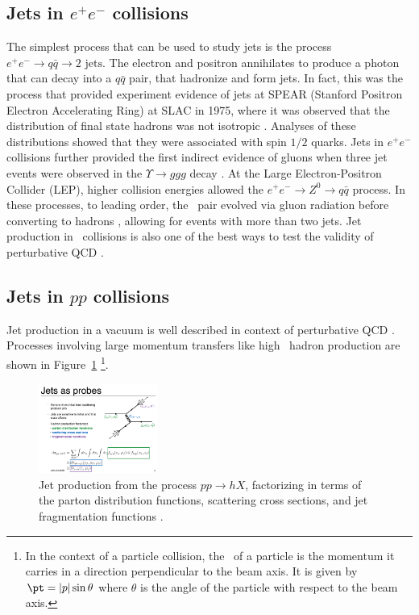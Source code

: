 \subsection{Jets in $e^+ e^-$ collisions}
The simplest process that can be used to study jets is the process $e^+ e^- \rightarrow q \bar{q} \rightarrow 2 \text{ jets}$.
The electron and positron annihilates to produce a photon that can decay into a $q \bar{q}$ pair, that hadronize and form jets.
In fact, this was the process that provided experiment evidence of jets at SPEAR (Stanford Positron Electron Accelerating Ring) at SLAC in 1975, where it was observed that the distribution of final state hadrons was not isotropic \cite{PhysRevLett.35.1609, PhysRevD.26.991}.
Analyses of these distributions showed that they were associated with spin $1/2$ quarks.
Jets in $e^+ e^-$ collisions further provided the first indirect evidence of gluons when three jet events were observed in the $\Upsilon \rightarrow ggg$ decay \cite{Berger:1978rr, Berger:1979cj}. 
At the Large Electron-Positron Collider (LEP), higher collision energies allowed the $e^+ e^- \rightarrow Z^0 \rightarrow q \bar{q}$ process.
In these processes, to leading order, the \qqbar\ pair evolved via gluon radiation before converting to hadrons \cite{Mueller_1991}, allowing for events with more than two jets.
Jet production in \epm\ collisions is also one of the best ways to test the validity of perturbative QCD \cite{Kramer:1986mc}.



\subsection{Jets in $pp$ collisions}
Jet production in a vacuum is well described in context of perturbative QCD \cite{Sjostrand:2007gs}.
Processes involving large momentum transfers like high \pt\ hadron production are shown in Figure~\ref{fig:feynman_jet}
\footnote{In the context of a particle collision, the \pt\ of a particle is the momentum it carries in a direction perpendicular to the beam axis.
It is given by $\pt = |p| \sin\theta$ where $\theta$ is the angle of the particle with respect to the beam axis.}.

\begin{figure}[htbp]
\begin{center}
\includegraphics[width=0.35\textwidth]{figures/theory/feynman_jet}
\caption{Jet production from the process $pp \rightarrow hX$, factorizing in terms of the parton distribution functions, scattering cross sections, and jet fragmentation functions \cite{Qin:2015srf}.}
\label{fig:feynman_jet}
\end{center}
\end{figure}

